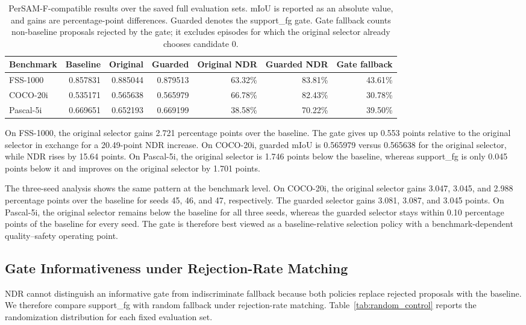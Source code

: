 \documentclass{CVM}
\begin{document}
\begin{table}[h!t]
\center
\caption{PerSAM-F-compatible results over the saved full evaluation sets. mIoU is reported as an absolute value, and gains are percentage-point differences. Guarded denotes the support\_fg gate. Gate fallback counts non-baseline proposals rejected by the gate; it excludes episodes for which the original selector already chooses candidate 0.}
\begin{tabular}{lrrrrrr}
\toprule
Benchmark & Baseline & Original & Guarded & Original NDR & Guarded NDR & Gate fallback \\
\midrule
FSS-1000 & 0.857831 & 0.885044 & 0.879513 & 63.32\% & 83.81\% & 43.61\% \\
COCO-20i & 0.535171 & 0.565638 & 0.565979 & 66.78\% & 82.43\% & 30.78\% \\
Pascal-5i & 0.669651 & 0.652193 & 0.669199 & 38.58\% & 70.22\% & 39.50\% \\
\bottomrule
\end{tabular}
\label{tab:main}
\end{table}

On FSS-1000, the original selector gains 2.721 percentage points over the baseline. The gate gives up 0.553 points relative to the original selector in exchange for a 20.49-point NDR increase. On COCO-20i, guarded mIoU is 0.565979 versus 0.565638 for the original selector, while NDR rises by 15.64 points. On Pascal-5i, the original selector is 1.746 points below the baseline, whereas support\_fg is only 0.045 points below it and improves on the original selector by 1.701 points.

The three-seed analysis shows the same pattern at the benchmark level. On COCO-20i, the original selector gains 3.047, 3.045, and 2.988 percentage points over the baseline for seeds 45, 46, and 47, respectively. The guarded selector gains 3.081, 3.087, and 3.045 points. On Pascal-5i, the original selector remains below the baseline for all three seeds, whereas the guarded selector stays within 0.10 percentage points of the baseline for every seed. The gate is therefore best viewed as a baseline-relative selection policy with a benchmark-dependent quality--safety operating point.

\subsection{Gate Informativeness under Rejection-Rate Matching}

NDR cannot distinguish an informative gate from indiscriminate fallback because both policies replace rejected proposals with the baseline. We therefore compare support\_fg with random fallback under rejection-rate matching. Table~\ref{tab:random_control} reports the randomization distribution for each fixed evaluation set.
\end{document}
